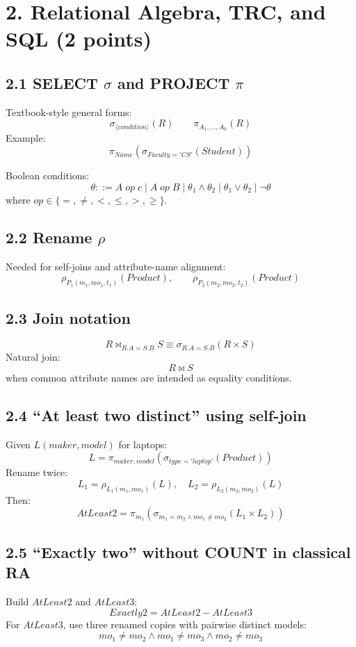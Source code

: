 \documentclass[10pt,a4paper]{article}
\begin{document}
\section{2. Relational Algebra, TRC, and SQL (2 points)}

\subsection{2.1 SELECT $\sigma$ and PROJECT $\pi$}
Textbook-style general forms:
\[
\boxed{\sigma_{\langle condition\rangle}(R)}\qquad
\boxed{\pi_{A_1,\ldots,A_k}(R)}
\]
Example:
\[
\pi_{Name}\left(\sigma_{Faculty='CS'}(Student)\right)
\]

Boolean conditions:
\[
\theta ::= A\;op\;c \mid A\;op\;B \mid \theta_1\land\theta_2 \mid \theta_1\lor\theta_2 \mid \neg\theta
\]
where $op\in\{=,\neq,<,\le,>,\ge\}$.

\subsection{2.2 Rename $\rho$}
Needed for self-joins and attribute-name alignment:
\[
\rho_{P_1(m_1,mo_1,t_1)}(Product),\qquad \rho_{P_2(m_2,mo_2,t_2)}(Product)
\]

\subsection{2.3 Join notation}
\[
R\bowtie_{R.A=S.B}S \equiv \sigma_{R.A=S.B}(R\times S)
\]
Natural join:
\[
R\bowtie S
\]
when common attribute names are intended as equality conditions.

\subsection{2.4 ``At least two distinct'' using self-join}
Given $L(maker,model)$ for laptops:
\[
L=\pi_{maker,model}\left(\sigma_{type='laptop'}(Product)\right)
\]
Rename twice:
\[
L_1=\rho_{L_1(m_1,mo_1)}(L),\quad L_2=\rho_{L_2(m_2,mo_2)}(L)
\]
Then:
\[
AtLeast2=\pi_{m_1}\left(\sigma_{m_1=m_2\land mo_1\neq mo_2}(L_1\times L_2)\right)
\]

\subsection{2.5 ``Exactly two'' without COUNT in classical RA}
Build $AtLeast2$ and $AtLeast3$:
\[
\boxed{Exactly2 = AtLeast2 - AtLeast3}
\]
For $AtLeast3$, use three renamed copies with pairwise distinct models:
\[
mo_1\neq mo_2\land mo_1\neq mo_3\land mo_2\neq mo_3
\]
\end{document}
